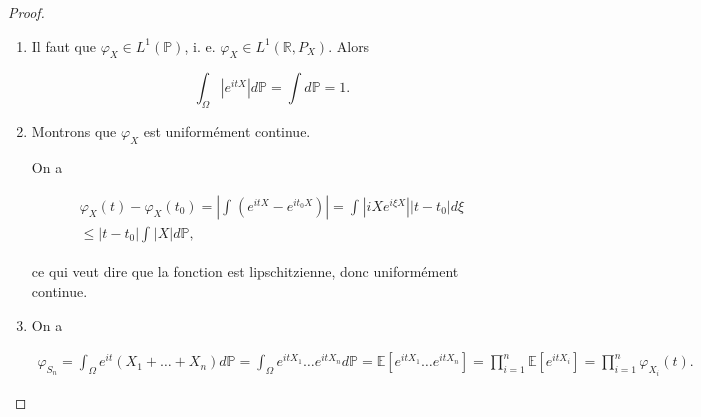 \documentclass[french]{book}
\theoremstyle{definition}
\theoremstyle{remark}
\begin{document}
\begin{proof}

  \

  \begin{enumerate}
    \item Il faut que \(\varphi_X \in L ^{1}(\mathbb{P})\), i. e. \(\varphi_X \in L ^{1}(\mathbb{R}, P_X)\). Alors

    \[\int_{\Omega}^{} \left\lvert e^{itX}\right\rvert d \mathbb{P} = \int d \mathbb{P}=1.\]

    \item Montrons que \(\varphi_X\) est uniformément continue.

    On a

    \begin{gather*}
      \varphi_X(t) - \varphi_X(t_0) = \left\lvert \int_{}^{} \left(e^{itX} - e^{it_0 X}\right) \right\rvert = \int_{}^{} \left\lvert iX e^{i \xi X} \right\rvert  \left\lvert t-t_0 \right\rvert d \xi \\
      \leq \left\lvert t-t_0 \right\rvert \int_{}^{} \left\lvert X \right\rvert d \mathbb{P},
    \end{gather*}

    ce qui veut dire que la fonction est lipschitzienne, donc uniformément continue.

    \item On a

    \begin{gather*}
      \varphi _{S_n} = \int_{\Omega} e^{it}(X_1 + \dots + X_n) d \mathbb{P} = \int_{\Omega}^{} e^{itX_1} \dots e^{itX_n} d \mathbb{P} = \mathbb{E}[e^{itX_1}\dots e^{itX_n}] = \prod_{i=1}^{n} \mathbb{E}[e^{itX_i}] = \prod_{i=1}^{n} \varphi _{X_i}(t).
    \end{gather*}
  \end{enumerate}
\end{proof}
\end{document}
